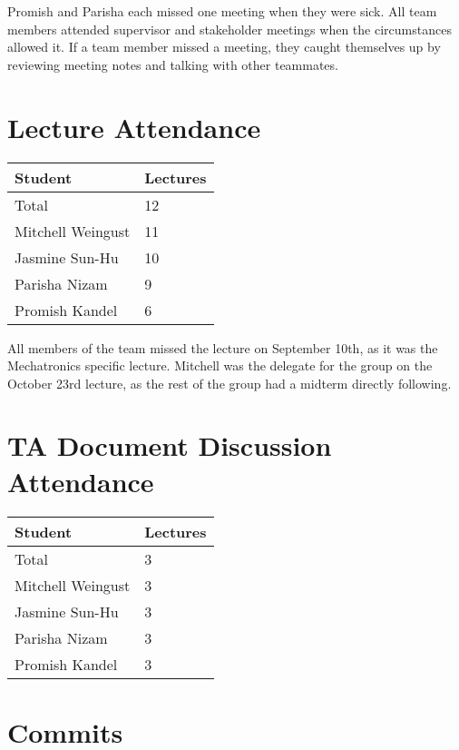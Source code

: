 \documentclass{article}
\begin{document}
\hspace{2em}Promish and Parisha each missed one meeting when they were sick. All team members attended supervisor and stakeholder meetings when the circumstances allowed it.
If a team member missed a meeting, they caught themselves up by reviewing meeting notes and talking with other teammates.

\section{Lecture Attendance}

\begin{table}[H]
\centering
\begin{tabular}{ll}
\toprule
\textbf{Student} & \textbf{Lectures}\\
\midrule
Total & 12\\
Mitchell Weingust & 11\\
Jasmine Sun-Hu & 10\\
Parisha Nizam & 9\\
Promish Kandel & 6\\
\bottomrule
\end{tabular}
\end{table}

\hspace{2em}All members of the team missed the lecture on September 10th, as it was the Mechatronics
specific lecture.
Mitchell was the delegate for the group on the October 23rd lecture, as the rest of the group had
a midterm directly following.\\

\section{TA Document Discussion Attendance}

\begin{table}[H]
\centering
\begin{tabular}{ll}
\toprule
\textbf{Student} & \textbf{Lectures}\\
\midrule
Total & 3\\
Mitchell Weingust & 3\\
Jasmine Sun-Hu & 3\\
Parisha Nizam & 3\\
Promish Kandel & 3\\
\bottomrule
\end{tabular}
\end{table}

\section{Commits}
\end{document}
